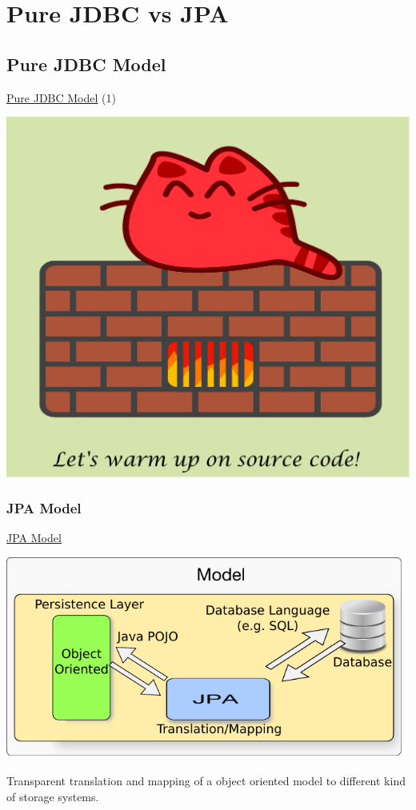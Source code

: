 \documentclass[xcolor=x11names,compress]{beamer}
\renewcommand{\(}{\begin{columns}}
\renewcommand{\)}{\end{columns}}
\newcommand{\<}[1]{\begin{column}{#1}}
\renewcommand{\>}{\end{column}}
\begin{document}
\section{Pure JDBC vs JPA}
\subsection{Pure JDBC Model}
\begin{frame}{\underline{Pure JDBC Model} (1)}
\justifying

\begin{center}

\includegraphics[keepaspectratio,width=.6\textwidth]{happycat}

\end{center}

\end{frame}

\subsubsection{JPA Model}
\begin{frame}{\underline{JPA Model}}
\justifying
\begin{center}
\includegraphics[keepaspectratio,width=.9\textwidth]{JPA-role}

Transparent translation and mapping of a object oriented model to different kind of storage systems.
\end{center}
\end{frame}
\end{document}
